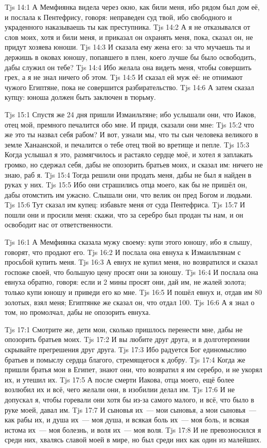 \vs Tjs 14:1
А Мемфиянка видела через окно,
как били меня, ибо рядом был дом её,
и послала к Пентефрису, говоря:
неправеден суд твой, ибо свободного
и украденного наказываешь ты как преступника.
\vs Tjs 14:2
А я не отказывался от слов моих, хотя и били меня,
и приказал он охранять меня, пока, сказал он,
не придут хозяева юноши.
\vs Tjs 14:3
И сказала ему жена его: за что мучаешь ты и держишь
в оковах юношу, попавшего в плен, коего лучше
бы было освободить, дабы служил он тебе?
\vs Tjs 14:4
Ибо желала она видеть меня, чтобы совершить грех,
а я не знал ничего об этом.
\vs Tjs 14:5
И сказал ей муж её: не отнимают чужого Египтяне,
пока не совершится разбирательство.
\vs Tjs 14:6
А затем сказал купцу: юноша должен быть заключен в тюрьму.

\vs Tjs 15:1
Спустя же 24 дня пришли Измаильтяне;
ибо услышали они, что Иаков, отец мой, премного печалится обо мне.
И придя, сказали они мне: 
\vs Tjs 15:2
что же это ты назвал себя рабом?
И вот, узнали мы, что ты сын человека великого в земле Ханаанской,
и печалится о тебе отец твой во вретище и пепле.
\vs Tjs 15:3
Когда услышал я это, размягчилось и растаяло сердце моё,
и хотел я заплакать громко, но сдержал себя,
дабы не опозорить братьев моих, и сказал им:
ничего не знаю, раб я.
\vs Tjs 15:4
Тогда решили они продать меня, дабы не был я найден
в руках у них.
\vs Tjs 15:5
Ибо они страшились отца моего, как бы не пришёл он,
дабы отомстить им ужасно.
Слышали они, что велик он пред Богом и людьми.
\vs Tjs 15:6
Тут сказал им купец: избавьте меня от суда Пентефриса.
\vs Tjs 15:7
И пошли они и просили меня:
скажи, что за серебро был продан ты нам,
и он освободит нас от ответственности.

\vs Tjs 16:1
А Мемфиянка сказала мужу своему:
купи этого юношу, ибо я слышу, говорят,
что продают его.
\vs Tjs 16:2
И послала она евнуха к Измаильтянам с просьбой купить меня.
\vs Tjs 16:3
А евнух не купил меня, но возвратился и сказал госпоже своей,
что большую цену просят они за юношу.
\vs Tjs 16:4
И послала она евнуха обратно, говоря:
если и 2 мины просят они, дай им,
не жалей золота;
только купи юношу и приведи его ко мне.
\vs Tjs 16:5
И пошёл евнух и, отдав им 80 золотых, взял меня;
Египтянке же сказал он, что отдал 100.
\vs Tjs 16:6
А я знал о том, но промолчал, дабы не опозорить евнуха.

\vs Tjs 17:1
Смотрите же, дети мои, сколько пришлось перенести мне,
дабы не опозорить братьев моих.
\vs Tjs 17:2
И вы любите друг друга, и в долготерпении скрывайте
прегрешения друг друга.
\vs Tjs 17:3
Ибо радуется Бог единомыслию братьев и помыслу сердца благого,
стремящегося к добру.
\vs Tjs 17:4
Когда же пришли братья мои в Египет, знают они,
что возвратил я им серебро, и не укорял их,
и утешил их.
\vs Tjs 17:5
А после смерти Иакова, отца моего, ещё более возлюбил их и всё,
чего желали они, в изобилии делал им.
\vs Tjs 17:6
И не допускал я, чтобы горевали они хотя бы из-за самого малого,
и всё, что было в руке моей, давал им.
\vs Tjs 17:7
И сыновья их~--- мои сыновья, а мои сыновья~--- как рабы их,
и душа их~--- моя душа, и всякая боль их~--- моя боль,
и всякая истома их~--- моя болезнь,
и воля их~--- моя воля.
\vs Tjs 17:8
И не превозносился я среди них, хвалясь славой моей в мире,
но был среди них как один из малейших.

